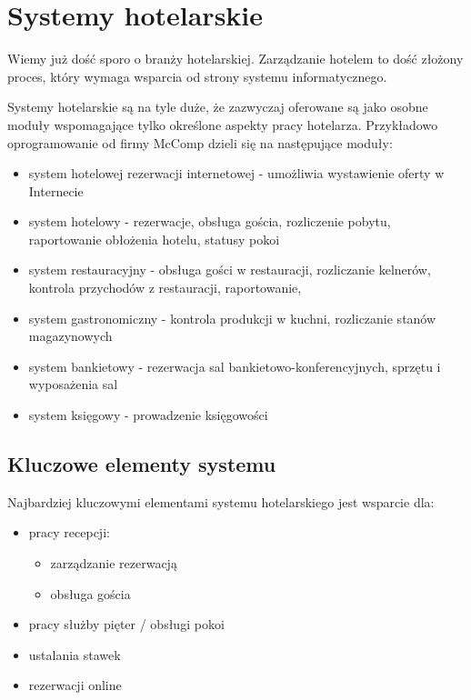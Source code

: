 \documentclass[a4paper,onecolumn,oneside,11pt,wide,floatssmall]{mwrep}
\theoremstyle{definition}
\theoremstyle{plain}%
\theoremstyle{remark}
\begin{document}
\section{Systemy hotelarskie}
Wiemy już dość sporo o branży hotelarskiej. Zarządzanie hotelem to dość złożony proces, który wymaga wsparcia od strony systemu informatycznego.

Systemy hotelarskie są na tyle duże, że zazwyczaj oferowane są jako osobne moduły wspomagające tylko określone aspekty pracy hotelarza. Przykładowo oprogramowanie od firmy McComp dzieli się na następujące moduły:

\begin{itemize}
  \item system hotelowej rezerwacji internetowej - umożliwia wystawienie oferty w Internecie
  \item system hotelowy - rezerwacje, obsługa gościa, rozliczenie pobytu, raportowanie obłożenia hotelu, statusy pokoi
  \item system restauracyjny - obsługa gości w restauracji, rozliczanie kelnerów, kontrola przychodów z restauracji, raportowanie,
  \item system gastronomiczny - kontrola produkcji w kuchni, rozliczanie stanów magazynowych
  \item system bankietowy - rezerwacja sal bankietowo-konferencyjnych, sprzętu i wyposażenia sal
  \item system księgowy - prowadzenie księgowości
\end{itemize}

\subsection{Kluczowe elementy systemu}

Najbardziej kluczowymi elementami systemu hotelarskiego jest wsparcie dla:
\begin{itemize} 
  \item pracy recepcji:
    \begin{itemize}
      \item zarządzanie rezerwacją
      \item obsługa gościa
    \end{itemize}
  \item pracy służby pięter / obsługi pokoi
  \item ustalania stawek
  \item rezerwacji online
\end{itemize}
\end{document}
